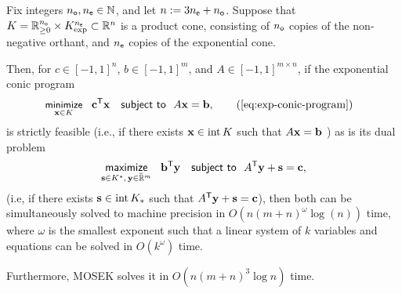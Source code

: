 \documentclass{article}
\begin{document}
\begin{lemma} \label{lem:mainlemma}
    Fix integers $n_{\sf o}, n_{\sf e} \in \mathbb N$, and let $n:= 3n_{\sf e} + n_{\sf o}$.
    Suppose that $K = \mathbb R_{\ge 0}^{n_{\sf o}} \times K^{n_{\sf e}}_{\exp} \subset \mathbb R^n$ is a product cone, consisting of $n_{\sf o}$ copies of the non-negative orthant, and $n_{\sf e}$ copies of the exponential cone. 
    
    Then, for
    $c \in [-1,1]^{n}$, $ b \in [-1,1]^m$, and $A \in [-1,1]^{m \times n}$,
    if the exponential conic program
    \begin{align*}
        &
        \minimize_{
            \mat x \in K}~~ \mat c^{\sf T} \mat x
        \quad\text{\sf subject to}~~ A \mat x = \mat b,
        \tag{\ref{eq:exp-conic-program}}
    \end{align*}
    is strictly feasible (i.e., if there exists $\mathbf{x} \in \mathrm{int}\, K$  such that $A \mathbf{x} = \mathbf{b}$ )
    as is its dual problem
    \[
        \mathop{\text{\sf maximize}} 
            \limits_{
            \mathbf{s} \in K^*,\, \mathbf{y} \in \mskip1mu\overline{\mskip-1mu\mathbb R\!}\,^m} ~~ \mathbf{b}^{\sf T} \mathbf{y}
        \quad\text{\sf subject to}~~  A^{\sf T} \mathbf{y}  +  \mathbf{s} = \mathbf{c},
    \]
    (i.e, if there exists $\mathbf{s} \in \mathrm{int}\,K_*$ such that $A^{\sf T} \mathbf{y} + \mathbf{s} = \mathbf{c}$), 
    then both
    can be simultaneously
    solved to machine precision
    in $O(n (m+n)^{\omega} \log(n)
    )$ time,
    where $\omega$ is the smallest exponent such that a linear system of $k$ variables and equations can be solved in $O(k^\omega)$ time. 
    
    Furthermore, MOSEK solves it in $O(n (m+n)^3 \log n)$ time. 
\end{lemma}
\end{document}
